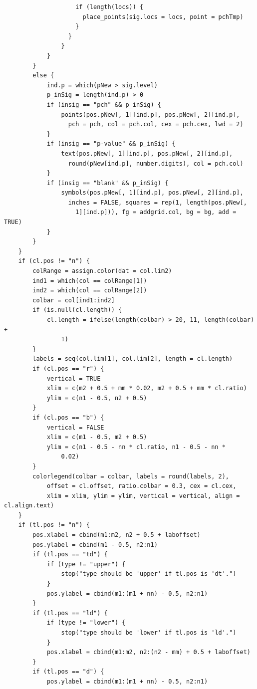 \documentclass[
]{article}
\begin{document}
\begin{verbatim}
                    if (length(locs)) {
                      place_points(sig.locs = locs, point = pchTmp)
                    }
                  }
                }
            }
        }
        else {
            ind.p = which(pNew > sig.level)
            p_inSig = length(ind.p) > 0
            if (insig == "pch" && p_inSig) {
                points(pos.pNew[, 1][ind.p], pos.pNew[, 2][ind.p], 
                  pch = pch, col = pch.col, cex = pch.cex, lwd = 2)
            }
            if (insig == "p-value" && p_inSig) {
                text(pos.pNew[, 1][ind.p], pos.pNew[, 2][ind.p], 
                  round(pNew[ind.p], number.digits), col = pch.col)
            }
            if (insig == "blank" && p_inSig) {
                symbols(pos.pNew[, 1][ind.p], pos.pNew[, 2][ind.p], 
                  inches = FALSE, squares = rep(1, length(pos.pNew[, 
                    1][ind.p])), fg = addgrid.col, bg = bg, add = TRUE)
            }
        }
    }
    if (cl.pos != "n") {
        colRange = assign.color(dat = col.lim2)
        ind1 = which(col == colRange[1])
        ind2 = which(col == colRange[2])
        colbar = col[ind1:ind2]
        if (is.null(cl.length)) {
            cl.length = ifelse(length(colbar) > 20, 11, length(colbar) + 
                1)
        }
        labels = seq(col.lim[1], col.lim[2], length = cl.length)
        if (cl.pos == "r") {
            vertical = TRUE
            xlim = c(m2 + 0.5 + mm * 0.02, m2 + 0.5 + mm * cl.ratio)
            ylim = c(n1 - 0.5, n2 + 0.5)
        }
        if (cl.pos == "b") {
            vertical = FALSE
            xlim = c(m1 - 0.5, m2 + 0.5)
            ylim = c(n1 - 0.5 - nn * cl.ratio, n1 - 0.5 - nn * 
                0.02)
        }
        colorlegend(colbar = colbar, labels = round(labels, 2), 
            offset = cl.offset, ratio.colbar = 0.3, cex = cl.cex, 
            xlim = xlim, ylim = ylim, vertical = vertical, align = cl.align.text)
    }
    if (tl.pos != "n") {
        pos.xlabel = cbind(m1:m2, n2 + 0.5 + laboffset)
        pos.ylabel = cbind(m1 - 0.5, n2:n1)
        if (tl.pos == "td") {
            if (type != "upper") {
                stop("type should be 'upper' if tl.pos is 'dt'.")
            }
            pos.ylabel = cbind(m1:(m1 + nn) - 0.5, n2:n1)
        }
        if (tl.pos == "ld") {
            if (type != "lower") {
                stop("type should be 'lower' if tl.pos is 'ld'.")
            }
            pos.xlabel = cbind(m1:m2, n2:(n2 - mm) + 0.5 + laboffset)
        }
        if (tl.pos == "d") {
            pos.ylabel = cbind(m1:(m1 + nn) - 0.5, n2:n1)

\end{verbatim}
\end{document}
